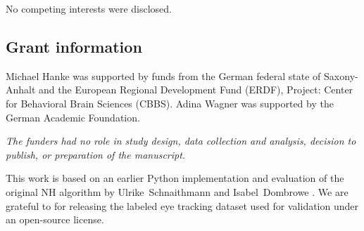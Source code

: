 
No competing interests were disclosed.

\subsection*{Grant information}

Michael Hanke was supported by funds from the German federal state of
Saxony-Anhalt and the European Regional Development Fund (ERDF),
Project: Center for Behavioral Brain Sciences (CBBS).
Adina Wagner was supported by the German Academic Foundation.

\textit{The funders had no role in study design, data collection and analysis,
decision to publish, or preparation of the manuscript.}


\begin{acknowledgements}


This work is based on an earlier Python implementation and evaluation of the
original NH algorithm by Ulrike~Schnaithmann and Isabel~Dombrowe
\citep{Sch2017}.  We are grateful to \cite{Andersson2017} for releasing the
labeled eye tracking dataset used for validation under an open-source license.

\end{acknowledgements}

